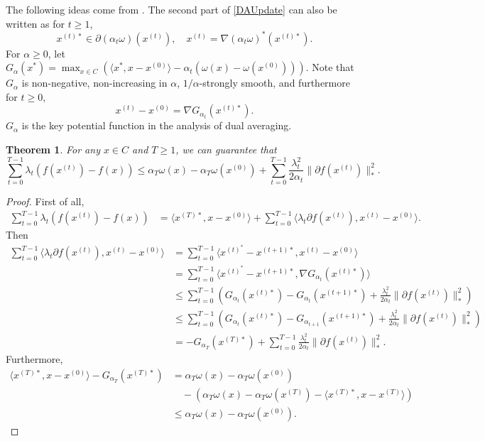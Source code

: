 \documentclass[openany]{book}
\newtheorem{theorem}{Theorem}[chapter]
\theoremstyle{definition}
\theoremstyle{remark}
\begin{document}
The following ideas come from \cite{N09}. The second part of \eqref{DAUpdate} can also be written as for $t\ge1$,
\begin{equation*}
    x^{(t)*}\in\partial(\alpha_t\omega)(x^{(t)}),\quad x^{(t)}=\nabla(\alpha_t\omega)^*(x^{(t)*}).
\end{equation*}
For $\alpha\ge0$, let $G_{\alpha}(x^*)=\max_{x\in C}\left(\langle x^*,x-x^{(0)}\rangle-\alpha_t\left(\omega(x)-\omega(x^{(0)})\right)\right)$. Note that $G_{\alpha}$ is non-negative, non-increasing in $\alpha$, $1/\alpha$-strongly smooth, and furthermore for $t\ge0$,
\begin{equation*}
    x^{(t)}-x^{(0)}=\nabla G_{\alpha_t}(x^{(t)*}).
\end{equation*}
$G_{\alpha}$ is the key potential function in the analysis of dual averaging.
\begin{theorem}
    For any $x\in C$ and $T\ge1$, we can guarantee that
    \begin{equation*}
            \sum_{t=0}^{T-1}\lambda_t\left(f(x^{(t)})-f(x)\right)\le\alpha_T\omega(x)-\alpha_T\omega(x^{(0)})+\sum_{t=0}^{T-1}\frac{\lambda_t^2}{2\alpha_t}\|\partial f(x^{(t)})\|_*^2.
    \end{equation*}
\end{theorem}
\begin{proof}
    First of all,
    \begin{align*}
        \sum_{t=0}^{T-1}\lambda_t\left(f(x^{(t)})-f(x)\right) & =\langle x^{(T)*},x-x^{(0)}\rangle+\sum_{t=0}^{T-1}\langle\lambda_t\partial f(x^{(t)}),x^{(t)}-x^{(0)}\rangle.
    \end{align*}
    Then
    \begin{align*}
        \sum_{t=0}^{T-1}\langle\lambda_t\partial f(x^{(t)}),x^{(t)}-x^{(0)}\rangle & =\sum_{t=0}^{T-1}\langle x^{(t)^*}-x^{(t+1)*},x^{(t)}-x^{(0)}\rangle \\
         & =\sum_{t=0}^{T-1}\langle x^{(t)^*}-x^{(t+1)*},\nabla G_{\alpha_t}(x^{(t)*})\rangle \\
         & \le \sum_{t=0}^{T-1}\left(G_{\alpha_t}(x^{(t)*})-G_{\alpha_t}(x^{(t+1)*})+\frac{\lambda_t^2}{2\alpha_t}\|\partial f(x^{(t)})\|_*^2\right) \\
         & \le \sum_{t=0}^{T-1}\left(G_{\alpha_t}(x^{(t)*})-G_{\alpha_{t+1}}(x^{(t+1)*})+\frac{\lambda_t^2}{2\alpha_t}\|\partial f(x^{(t)})\|_*^2\right) \\
         & =-G_{\alpha_T}(x^{(T)*})+\sum_{t=0}^{T-1}\frac{\lambda_t^2}{2\alpha_t}\|\partial f(x^{(t)})\|_*^2.
    \end{align*}
    Furthermore,
    \begin{align*}
        \langle x^{(T)*},x-x^{(0)}\rangle-G_{\alpha_T}(x^{(T)*}) & =\alpha_T\omega(x)-\alpha_T\omega(x^{(0)}) \\
         & \quad-\left(\alpha_T\omega(x)-\alpha_T\omega(x^{(T)})-\langle x^{(T)*},x-x^{(T)}\rangle\right) \\
         & \le\alpha_T\omega(x)-\alpha_T\omega(x^{(0)}).
    \end{align*}
\end{proof}
\end{document}
